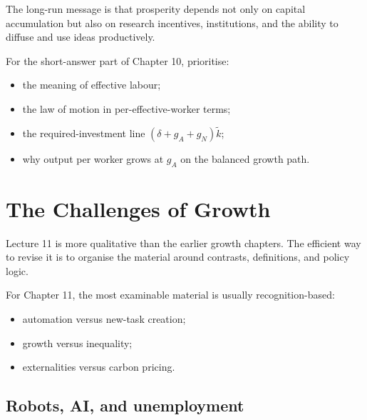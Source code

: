 \documentclass[12pt]{article}
\begin{document}
\begin{policynote}
The long-run message is that prosperity depends not only on capital accumulation but also on research incentives, institutions, and the ability to diffuse and use ideas productively.
\end{policynote}

\begin{examtip}[title={Exam Focus: High-yield analytical core}]
For the short-answer part of Chapter 10, prioritise:
\begin{itemize}[leftmargin=1.5em]
\item the meaning of effective labour;
\item the law of motion in per-effective-worker terms;
\item the required-investment line \((\delta+g_A+g_N)\tilde{k}\);
\item why output per worker grows at \(g_A\) on the balanced growth path.
\end{itemize}
\end{examtip}

\newpage
\section{The Challenges of Growth}

Lecture 11 is more qualitative than the earlier growth chapters. The efficient way to revise it is to organise the material around contrasts, definitions, and policy logic.

\begin{examtip}[title={Exam Focus: Likely MCQ-only}]
For Chapter 11, the most examinable material is usually recognition-based:
\begin{itemize}[leftmargin=1.5em]
\item automation versus new-task creation;
\item growth versus inequality;
\item externalities versus carbon pricing.
\end{itemize}
\end{examtip}

\subsection{Robots, AI, and unemployment}
\end{document}
